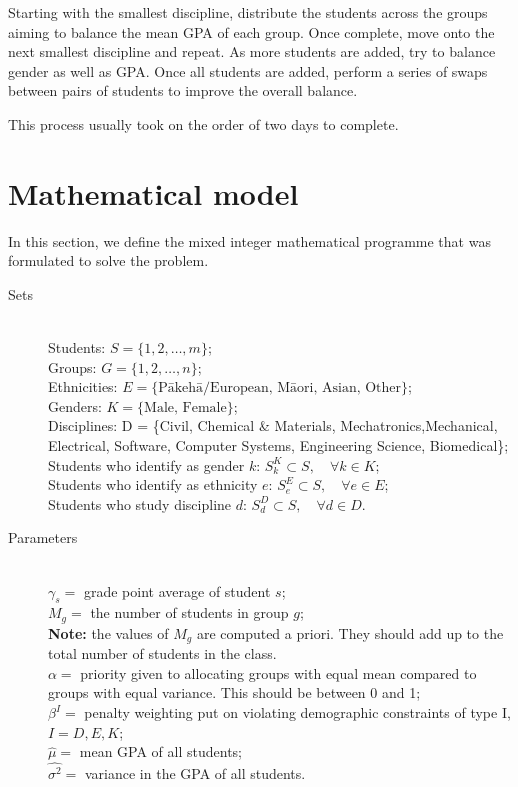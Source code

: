\documentclass[12pt]{ORSNZ}
\begin{document}
Starting with the smallest discipline, distribute the students across the groups aiming to balance the mean GPA of each group. Once complete, move onto the next smallest discipline and repeat. As more students are added, try to balance gender as well as GPA. Once all students are added, perform a series of swaps between pairs of students to improve the overall balance.

This process usually took on the order of two days to complete.

\section{Mathematical model}
In this section, we define the mixed integer mathematical programme that was formulated to solve the problem.
\begin{description}
\item[Sets] \mbox{}\\
        Students: $S = \{1, 2, \dots, m\}$;\\
        Groups: $G = \{1, 2, \dots, n\}$;\\
        Ethnicities: $E = \{\mbox{P\=akeh\=a/European, M\=aori, Asian, Other}\}$;\\
        Genders: $K = \{\mbox{Male, Female}\}$;\\
        Disciplines: D = \{Civil, Chemical \& Materials, Mechatronics,Mechanical, Electrical, Software, Computer Systems, Engineering Science, Biomedical\};
        Students who identify as gender $k$: $S^K_k \subset S, \quad \forall k \in K$;\\
        Students who identify as ethnicity $e$: $S^E_e \subset S, \quad \forall e \in E$;\\
        Students who study discipline $d$: $S^D_d \subset S, \quad \forall d \in D$.



\item[Parameters] \mbox{} \\
$\gamma_s = $ grade point average of student $s$; \\
$M_g = $ the number of students in group $g$;\\
\textbf{Note:} the values of $M_g$ are computed a priori. They should add up to the total number of students in the class.\\
$\alpha = $ priority given to allocating groups with equal mean compared to groups with equal variance. This should be between 0 and 1;\\
$\beta^I = $ penalty weighting put on violating demographic constraints of type I, $I= D, E, K$;\\
$\hat{\mu} = $ mean GPA of all students;\\
$\hat{\sigma^2} = $ variance in the GPA of all students.


\end{description}
\end{document}

